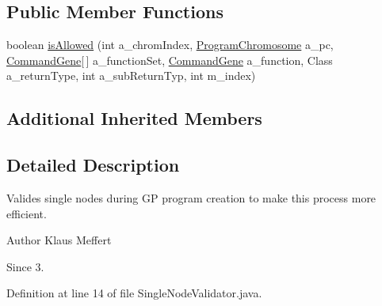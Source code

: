 \subsection*{Public Member Functions}
\begin{DoxyCompactItemize}
\item 
boolean \hyperlink{classexamples_1_1gp_1_1tictactoe_1_1_single_node_validator_a32e7b83ad42a193123dbe4dbf9aefc25}{is\-Allowed} (int a\-\_\-chrom\-Index, \hyperlink{classorg_1_1jgap_1_1gp_1_1impl_1_1_program_chromosome}{Program\-Chromosome} a\-\_\-pc, \hyperlink{classorg_1_1jgap_1_1gp_1_1_command_gene}{Command\-Gene}\mbox{[}$\,$\mbox{]} a\-\_\-function\-Set, \hyperlink{classorg_1_1jgap_1_1gp_1_1_command_gene}{Command\-Gene} a\-\_\-function, Class a\-\_\-return\-Type, int a\-\_\-sub\-Return\-Typ, int m\-\_\-index)
\end{DoxyCompactItemize}
\subsection*{Additional Inherited Members}


\subsection{Detailed Description}
Valides single nodes during G\-P program creation to make this process more efficient.

\begin{DoxyAuthor}{Author}
Klaus Meffert 
\end{DoxyAuthor}
\begin{DoxySince}{Since}
3. 
\end{DoxySince}


Definition at line 14 of file Single\-Node\-Validator.\-java.



